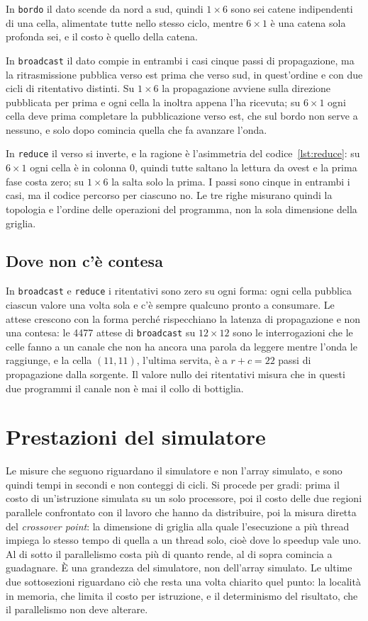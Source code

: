 In \texttt{bordo} il dato scende da nord a sud, quindi $1\times6$ sono sei
catene indipendenti di una cella, alimentate tutte nello stesso ciclo, mentre
$6\times1$ è una catena sola profonda sei, e il costo è quello della catena.

In \texttt{broadcast} il dato compie in entrambi i casi cinque passi di propagazione, ma la
ritrasmissione pubblica verso est prima che verso sud, in quest'ordine e con due
cicli di ritentativo distinti. Su $1\times6$ la propagazione avviene sulla
direzione pubblicata per prima e ogni cella la inoltra appena l'ha ricevuta; su
$6\times1$ ogni cella deve prima completare la pubblicazione verso est, che sul
bordo non serve a nessuno, e solo dopo comincia quella che fa avanzare l'onda.

In \texttt{reduce} il verso si inverte, e la ragione è l'asimmetria del
codice~\ref{lst:reduce}: su $6\times1$ ogni cella è in colonna 0, quindi tutte
saltano la lettura da ovest e la prima fase costa zero; su $1\times6$ la salta solo la prima. I passi sono cinque in entrambi i casi, ma il codice percorso per
ciascuno no. Le tre righe misurano quindi la topologia e l'ordine delle operazioni del
programma, non la sola dimensione della griglia.

\subsection{Dove non c'è contesa}

In \texttt{broadcast} e \texttt{reduce} i
ritentativi sono zero su ogni forma: ogni cella pubblica ciascun valore una volta sola e c'è
sempre qualcuno pronto a consumare. Le attese crescono con la forma perché
rispecchiano la latenza di propagazione e non una contesa: le 4477
attese di \texttt{broadcast} su $12\times12$ sono le interrogazioni che le celle fanno a un canale che non ha ancora una parola da leggere mentre l'onda le raggiunge, e la cella
$(11,11)$, l'ultima servita, è a $r+c = 22$ passi di propagazione dalla sorgente. Il valore
nullo dei ritentativi misura
che in questi due programmi il canale non è mai il collo di bottiglia.

\section{Prestazioni del simulatore}
\label{sec:prestazioni}

Le misure che seguono riguardano il simulatore e non l'array simulato, e sono
quindi tempi in secondi e non conteggi di cicli. Si procede per gradi: prima il
costo di un'istruzione simulata su un solo processore, poi il costo delle due
regioni parallele confrontato con il lavoro che hanno da distribuire, poi la
misura diretta del \emph{crossover point}: la dimensione di griglia alla quale l'esecuzione a più thread
impiega lo stesso tempo di quella a un thread solo, cioè dove lo speedup vale
uno. Al di sotto il parallelismo costa più di quanto rende, al di sopra comincia
a guadagnare. È una grandezza del simulatore, non dell'array simulato. Le
ultime due sottosezioni riguardano ciò che resta una
volta chiarito quel punto: la località in memoria, che limita il costo per
istruzione, e il determinismo del risultato, che il parallelismo non deve
alterare.

